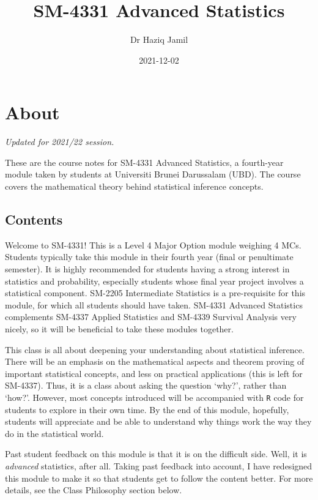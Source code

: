\documentclass[
]{book}
\title{SM-4331 Advanced Statistics}
\author{Dr Haziq Jamil}
\date{2021-12-02}
\theoremstyle{definition}
\theoremstyle{definition}
\theoremstyle{definition}
\theoremstyle{definition}
\theoremstyle{remark}
\begin{document}
\maketitle

{
\setcounter{tocdepth}{1}
\tableofcontents
}
\hypertarget{about}{%
\chapter*{About}\label{about}}

\emph{Updated for 2021/22 session.}

These are the course notes for SM-4331 Advanced Statistics, a fourth-year module taken by students at Universiti Brunei Darussalam (UBD).
The course covers the mathematical theory behind statistical inference concepts.

\hypertarget{contents}{%
\section*{Contents}\label{contents}}

Welcome to SM-4331!
This is a Level 4 Major Option module weighing 4 MCs.
Students typically take this module in their fourth year (final or penultimate semester).
It is highly recommended for students having a strong interest in statistics and probability, especially students whose final year project involves a statistical component.
SM-2205 Intermediate Statistics is a pre-requisite for this module, for which all students should have taken.
SM-4331 Advanced Statistics complements SM-4337 Applied Statistics and SM-4339 Survival Analysis very nicely, so it will be beneficial to take these modules together.

This class is all about deepening your understanding about statistical inference.
There will be an emphasis on the mathematical aspects and theorem proving of important statistical concepts, and less on practical applications (this is left for SM-4337).
Thus, it is a class about asking the question `why?', rather than `how?'.
However, most concepts introduced will be accompanied with \texttt{R} code for students to explore in their own time.
By the end of this module, hopefully, students will appreciate and be able to understand why things work the way they do in the statistical world.

Past student feedback on this module is that it is on the difficult side.
Well, it is \emph{advanced} statistics, after all.
Taking past feedback into account, I have redesigned this module to make it so that students get to follow the content better.
For more details, see the Class Philosophy section below.
\end{document}
